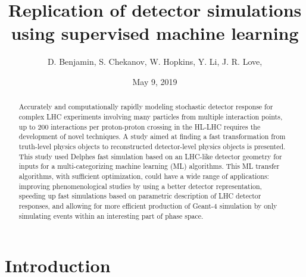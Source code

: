\documentclass[showpacs,showkeys,preprint,prd,nofootinbib,linenumbers,12pt]{revtex4-1}
\begin{document}


\date{May 9, 2019}

\vspace{2.5cm}

\title{
  Replication of detector simulations using supervised machine learning 
}


\author{D. Benjamin, S. Chekanov, W. Hopkins, Y. Li, J. R. Love,}
% 



\begin{abstract}
Accurately and computationally rapidly modeling stochastic detector response for complex LHC experiments involving many particles from multiple interaction points, up to 200 interactions per proton-proton crossing in the HL-LHC requires the development of novel techniques. A study aimed at finding a fast transformation from truth-level physics objects to reconstructed detector-level physics objects is presented. This study used Delphes fast simulation based on an LHC-like detector geometry for inputs for a multi-categorizing machine learning (ML) algorithms. This ML transfer algorithms, with sufficient optimization, could have a wide range of applications: improving phenomenological studies by using a better detector representation, speeding up fast simulations based on parametric description of LHC detector responses, and allowing for more efficient production of Geant-4 simulation by only simulating events within an interesting part of phase space.
\end{abstract}

\maketitle

\section{Introduction}
\end{document}
